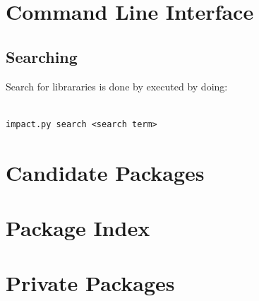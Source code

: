 \documentclass[11pt,a4paper,twocolumn]{article}
\begin{document}
\section{Command Line Interface}
\label{sec:command_line}




\subsection{Searching} %
\label{cmd:search}

Search for librararies is done by executed by doing:
\lstset{language=bash}
\begin{lstlisting}[frame=shadowbox]  % Start your code-block

impact.py search <search term>
\end{lstlisting}

\section{Candidate Packages}
\label{sec:candidates}





\section{Package Index}
\label{sec:index}




\section{Private Packages}
\label{sec:private}
\end{document}
